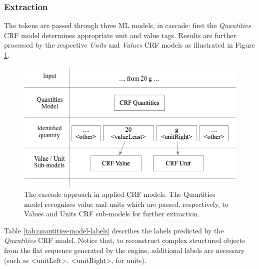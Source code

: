 \documentclass[sigconf]{acmart}
\begin{document}
\subsubsection{Extraction}
The tokens are passed through three ML models, in cascade: first the \textit{Quantities} CRF model determines appropriate unit and value tags. Results are further processed by the respective \textit{Units} and \textit{Values} CRF models as illustrated in Figure \ref{fig:schema-cascade}.  

\begin{figure}[ht]
  \centering
  \includegraphics[width=\linewidth]{images/schema-cascade}
  \caption{The cascade approach in applied CRF models. The Quantities model recognises value and units which are passed, respectively, to Values and Units CRF sub-models for further extraction.}
  \label{fig:schema-cascade}
\end{figure}

Table \ref{tab:quantities-model-labels} describes the labels predicted by the \textit{Quantities} CRF model. Notice that, to reconstruct complex structured objects from the flat sequence generated by the engine, additional labels are necessary (such as <unitLeft>, <unitRight>, for units).
\end{document}
